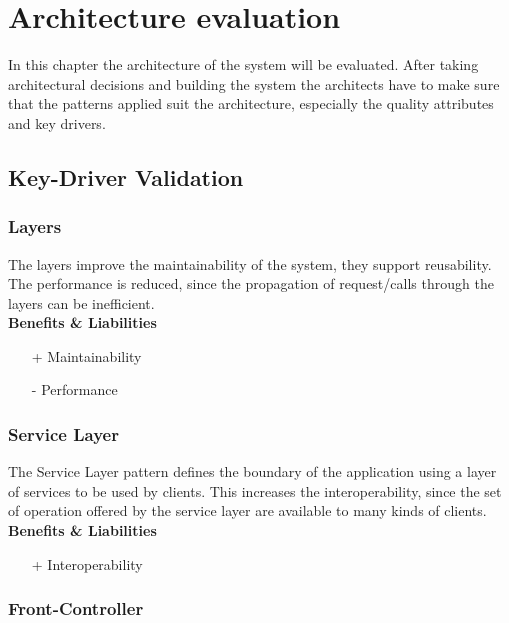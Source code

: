 
\newcommand{\bo}[1]{\textbf{#1}}

\chapter{Architecture evaluation}
\label{ch:evaluation}

In this chapter the architecture of the system will be evaluated. After taking architectural decisions and building the system the architects have to make sure that the patterns applied suit the architecture, especially the quality attributes and key drivers.%

\section{Key-Driver Validation}

\subsection*{Layers}
The layers improve the maintainability of the system, they support reusability.
The performance is reduced, since the propagation of request/calls through the layers can be inefficient.\\
\textbf{Benefits \& Liabilities} ~
\begin{itemize}
\item[+] Maintainability
\item[-] Performance 
\end{itemize}

\subsection*{Service Layer}
The Service Layer pattern defines the boundary of the application using a layer of services to be used by clients. This increases the interoperability, since the set of operation offered by the service layer are available to many kinds of clients. \\
\textbf{Benefits \& Liabilities} ~
\begin{itemize}
\item[+] Interoperability 
\end{itemize}

\subsection*{Front-Controller}
